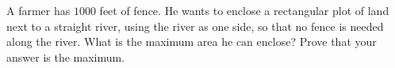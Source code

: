 A farmer has $1000$ feet of fence. He wants to enclose a rectangular plot of land next to a straight river, using the river as one side, so that no fence is needed along the river. What is the maximum area he can enclose? Prove that your answer is the maximum.
